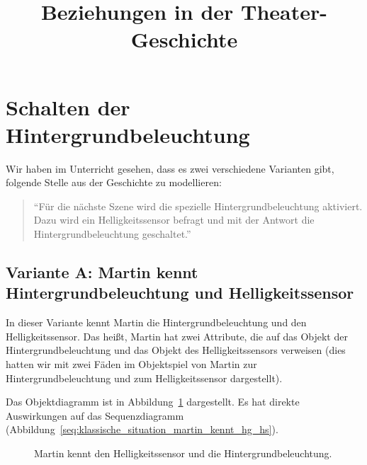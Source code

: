 \documentclass[11pt, a4paper]{scrartcl}
\title{Beziehungen in der Theater-Geschichte}
\begin{document}

\section*{Schalten der Hintergrundbeleuchtung}

Wir haben im Unterricht gesehen, dass es zwei verschiedene Varianten gibt, folgende Stelle aus der Geschichte zu modellieren:
\begin{quote}
\enquote{Für die nächste Szene wird die spezielle Hintergrundbeleuchtung aktiviert. Dazu wird ein Helligkeitssensor befragt und mit der Antwort die Hintergrundbeleuchtung geschaltet.}
\end{quote}

\subsection*{Variante A: Martin kennt Hintergrundbeleuchtung und Helligkeitssensor}

In dieser Variante kennt Martin die Hintergrundbeleuchtung und den Helligkeitssensor. Das heißt, Martin hat zwei Attribute, die auf das Objekt der Hintergrundbeleuchtung und das Objekt des Helligkeitssensors verweisen (dies hatten wir mit zwei Fäden im Objektspiel von Martin zur Hintergrundbeleuchtung und zum Helligkeitssensor dargestellt). 

Das Objektdiagramm ist in Abbildung~\ref{fig:martin_kennt_hg_hs} dargestellt. Es hat direkte Auswirkungen auf das Sequenzdiagramm (Abbildung~\ref{seq:klassische_situation_martin_kennt_hg_hs}).


\hfill
\begin{figure}[H]
\centering
{}
\caption{Martin kennt den Helligkeitssensor und die Hintergrundbeleuchtung.}
\label{fig:martin_kennt_hg_hs}
\end{figure}
\end{document}
